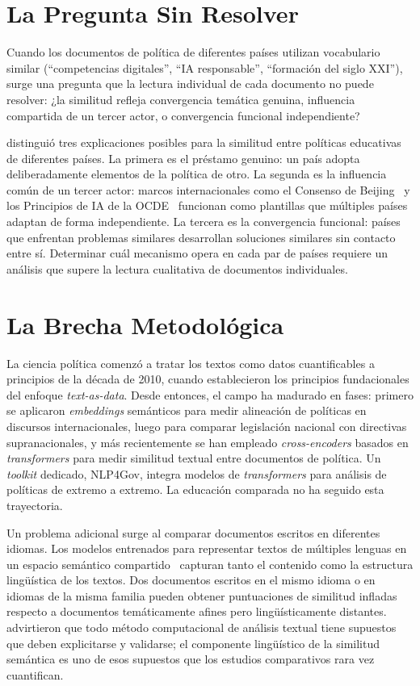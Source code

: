 \section{La Pregunta Sin Resolver}
\label{sec:pregunta}

Cuando los documentos de política de diferentes países utilizan vocabulario similar (``competencias digitales'', ``IA responsable'', ``formación del siglo XXI''), surge una pregunta que la lectura individual de cada documento no puede resolver: ¿la similitud refleja convergencia temática genuina, influencia compartida de un tercer actor, o convergencia funcional independiente?

\citet{steinerkhamsi2014cross} distinguió tres explicaciones posibles para la similitud entre políticas educativas de diferentes países. La primera es el préstamo genuino: un país adopta deliberadamente elementos de la política de otro. La segunda es la influencia común de un tercer actor: marcos internacionales como el Consenso de Beijing~\citep{unesco2019beijing} y los Principios de IA de la OCDE~\citep{oecd2019ai} funcionan como plantillas que múltiples países adaptan de forma independiente. La tercera es la convergencia funcional: países que enfrentan problemas similares desarrollan soluciones similares sin contacto entre sí. Determinar cuál mecanismo opera en cada par de países requiere un análisis que supere la lectura cualitativa de documentos individuales.


\section{La Brecha Metodológica}
\label{sec:brecha}

La ciencia política comenzó a tratar los textos como datos cuantificables a principios de la década de 2010, cuando \citet{grimmer2013text} establecieron los principios fundacionales del enfoque \textit{text-as-data}. Desde entonces, el campo ha madurado en fases: primero se aplicaron \textit{embeddings} semánticos para medir alineación de políticas en discursos internacionales, luego para comparar legislación nacional con directivas supranacionales, y más recientemente se han empleado \textit{cross-encoders} basados en \textit{transformers} para medir similitud textual entre documentos de política. Un \textit{toolkit} dedicado, NLP4Gov, integra modelos de \textit{transformers} para análisis de políticas de extremo a extremo. La educación comparada no ha seguido esta trayectoria.

Un problema adicional surge al comparar documentos escritos en diferentes idiomas. Los modelos entrenados para representar textos de múltiples lenguas en un espacio semántico compartido~\citep{conneau2020unsupervised} capturan tanto el contenido como la estructura lingüística de los textos. Dos documentos escritos en el mismo idioma o en idiomas de la misma familia pueden obtener puntuaciones de similitud infladas respecto a documentos temáticamente afines pero lingüísticamente distantes. \citet{grimmer2013text} advirtieron que todo método computacional de análisis textual tiene supuestos que deben explicitarse y validarse; el componente lingüístico de la similitud semántica es uno de esos supuestos que los estudios comparativos rara vez cuantifican.


